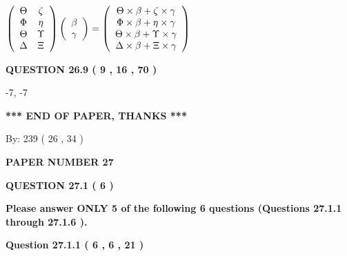 \documentclass[12pt]{article}
\begin{document}
$  %
 \left( \begin{array}
 {
 c
 c
 }
 \Theta & 
                    \zeta \\ 
 \Phi & 
 \eta \\ 
 \Theta & 
 \Upsilon \\ 
 \Delta & 
                    \Xi
 \end{array} \right)
 \left( \begin{array}
 {
 c
 }
 \beta \\ 
 \gamma
 \end{array} \right)
=
 \left( \begin{array}
 {
 c
 }
  \Theta \times  \beta +                     \zeta \times  \gamma \\ 
  \Phi \times  \beta +  \eta \times  \gamma \\ 
  \Theta \times  \beta +  \Upsilon \times  \gamma \\ 
  \Delta \times  \beta +                     \Xi \times  \gamma
 \end{array} \right)
$
 
  
  
{\textbf{\large{QUESTION
26.9 
 (           9 ,          16 ,          70 )
}}}

-7,  %
-7
 
   
   
   
   
\vspace{1.0in} 
{\textbf{\large{ *** END OF PAPER, THANKS *** }}} 
   
   
\hspace{1.0in} By: 
         239 (          26 ,           34 )
   
   
   
   
\newpage 
\setcounter{page}{ 
    27001 } 
   
   
 {\textbf{ \Large{ PAPER NUMBER           27  }}}
   
   
   
   
  
\vspace{0.2in}
  
{\textbf{\Large{QUESTION
27.1 
 (           6 )
}}}
  
  
{\textbf{\Large{Please answer ONLY  %
           5  %
 of the following  %
           6  %
 questions (Questions  %
27.1.1 %
 through  %
27.1.6 %
 ). }}}
   
   
  
  
{\textbf{\large{Question
27.1.1 
 (           6 ,           6 ,          21 )
}}}
\end{document}
